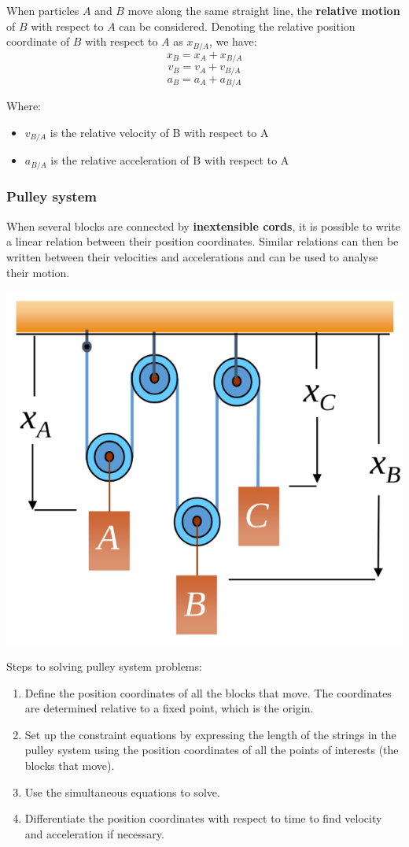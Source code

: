 \documentclass[11pt]{article}
\begin{document}
When particles \(A\) and \(B\) move along the same straight line, the \textbf{relative motion} of \(B\) with respect to \(A\) can be considered. Denoting the relative position coordinate of \(B\) with respect to \(A\) as \(x_{B/A}\), we have:
\[x_B = x_A + x_{B/A}\]
\[v_B = v_A + v_{B/A}\]
\[a_B = a_A + a_{B/A}\]

Where:
\begin{itemize}
\item \(v_{B/A}\) is the relative velocity of B with respect to A
\item \(a_{B/A}\) is the relative acceleration of B with respect to A
\end{itemize}

 \newpage

\subsubsection{Pulley system}
\label{sec:orge44d5c3}
When several blocks are connected by \textbf{inextensible cords}, it is possible to write a linear relation between their position coordinates. Similar relations can then be written between their velocities and accelerations and can be used to analyse their motion.

\begin{center}
\includegraphics[width=.9\linewidth]{./images/pulley-system-diagram.png}
\end{center}

Steps to solving pulley system problems:
\begin{enumerate}
\item Define the position coordinates of all the blocks that move. The coordinates are determined relative to a fixed point, which is the origin.
\item Set up the constraint equations by expressing the length of the strings in the pulley system using the position coordinates of all the points of interests (the blocks that move).
\item Use the simultaneous equations to solve.
\item Differentiate the position coordinates with respect to time to find velocity and acceleration if necessary.
\end{enumerate}
\end{document}

